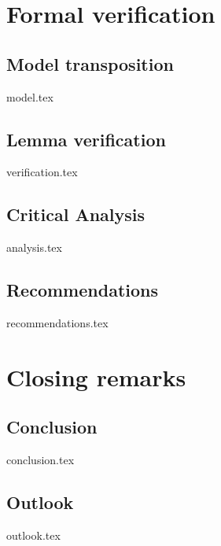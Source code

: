 \documentclass[a4paper,12pt,twoside]{report}
\begin{document}
\clearpage

\chapter{Formal verification}
\label{chap:intro}

\section{Model transposition}
\label{sec:problem}
{model.tex}

\section{Lemma verification}
\label{sec:goal}
{verification.tex}

\section{Critical Analysis}
\label{sec:method}
{analysis.tex}

\section{Recommendations}
\label{sec:method}
{recommendations.tex}

\clearpage

\chapter{Closing remarks}
\label{chap:intro}

\section{Conclusion}
\label{sec:problem}
{conclusion.tex}

\section{Outlook}
\label{sec:goal}
{outlook.tex}

\clearpage

\printbibliography[title={Literatur},heading=bibintoc,nottype=online]

\printbibliography[title={Online Ressourcen},heading=bibintoc,type=online]

\clearpage

\appendices
\end{document}
